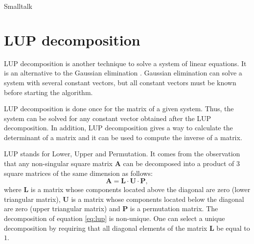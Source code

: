 \begin{displaycode}{Smalltalk}
\section{LUP decomposition}
\label{sec:lup} LUP decomposition is another technique to solve a
system of linear equations. It is an alternative to the Gaussian
elimination \cite{CorLeiRiv}. Gaussian elimination can solve a
system with several constant vectors, but all constant vectors
must be known before starting the algorithm.

LUP decomposition is done once for the matrix of a given system.
Thus, the system can be solved for any constant vector obtained
after the LUP decomposition. In addition, LUP decomposition gives
a way to calculate the determinant of a matrix and it can be used
to compute the inverse of a matrix.

LUP stands for Lower, Upper and Permutation. It comes from the
observation that any non-singular square matrix $\textbf{A}$ can be
decomposed into a product of 3 square matrices of the same
dimension as follows:
\begin{equation}
\label{eq:lup}
  \textbf{A}=\textbf{L}\cdot\textbf{U}\cdot\textbf{P},
\end{equation}
where ${\textbf{L}}$ is a matrix whose components located above the
diagonal are zero (lower triangular matrix), ${\textbf{U}}$ is a matrix
whose components located below the diagonal are zero (upper
triangular matrix) and ${\textbf{P}}$ is a permutation matrix. The
decomposition of equation \ref{eq:lup} is non-unique. One can
select a unique decomposition by requiring that all diagonal
elements of the matrix ${\textbf{L}}$ be equal to $1$.


\end{displaycode}
